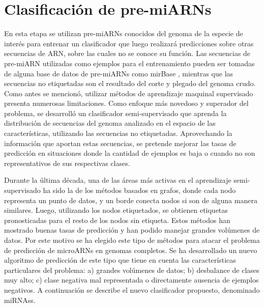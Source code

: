 \section{Clasificación de pre-miARNs}

En esta etapa se utilizan pre-miARNs conocidos del genoma de la especie de interés para entrenar un clasificador que luego realizará predicciones sobre otras
secuencias de ARN, sobre las cuales no se  conoce su función. Las secuencias de pre-miARN utilizadas como ejemplos para el entrenamiento pueden ser tomadas de
alguna base de datos de pre-miARNs como  mirBase \citep{kozomara2014mirbase}, mientras que las secuencias no etiquetadas son el resultado del corte y plegado
del genoma crudo. Como antes se mencionó, utilizar métodos de aprendizaje maquinal supervisado presenta numerosas limitaciones. Como enfoque más novedoso y
superador del problema, se desarrolló un clasificador semi-supervisado que aprenda la distribución de secuencias del genoma analizado en el espacio de las
características, utilizando las secuencias no etiquetadas. Aprovechando la información que aportan estas secuencias, se pretende mejorar las tasas de predicción
en situaciones donde la cantidad de ejemplos es baja o cuando no son representativos de sus respectivas clases.

Durante la última década, una de las áreas más activas en el aprendizaje semi-supervisado ha sido la de los métodos basados en grafos, donde cada nodo
representa un punto de datos, y un borde conecta nodos si son de alguna manera similares. Luego, utilizando los nodos etiquetados, se obtienen etiquetas
pronosticadas para el resto de los nodos sin etiqueta. Estos métodos han mostrado buenas tasas de predicción \citep{joachims2003transductive} y han podido
manejar grandes volúmenes de datos. Por este motivo se ha elegido este tipo de métodos para atacar el problema de predicción de microARNs en genomas
completos. Se ha desarrollado un nuevo algoritmo de predicción de este tipo que tiene en cuenta las características particulares del problema: a) grandes
volúmenes de datos; b) desbalance de clases muy alto; c) clase negativa mal representada o directamente ausencia de ejemplos negativos. A continuación se
describe el nuevo clasificador propuesto, denominado miRNAss.

